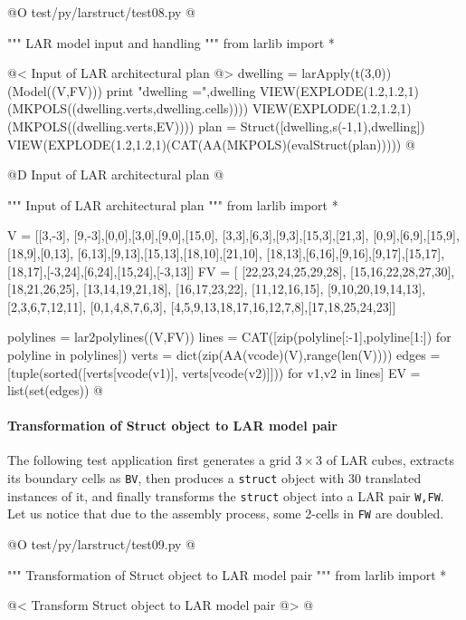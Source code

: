 \documentclass[11pt,oneside]{article}    %
\begin{document}
@O test/py/larstruct/test08.py
@{""" LAR model input and handling """
from larlib import *

@< Input of LAR architectural plan @>
dwelling = larApply(t(3,0))(Model((V,FV)))
print "\n dwelling =",dwelling
VIEW(EXPLODE(1.2,1.2,1)(MKPOLS((dwelling.verts,dwelling.cells))))
VIEW(EXPLODE(1.2,1.2,1)(MKPOLS((dwelling.verts,EV))))
plan = Struct([dwelling,s(-1,1),dwelling])
VIEW(EXPLODE(1.2,1.2,1)(CAT(AA(MKPOLS)(evalStruct(plan)))))
@}



@D Input of LAR architectural plan
@{""" Input of LAR architectural plan """
from larlib import *

V = [[3,-3],
[9,-3],[0,0],[3,0],[9,0],[15,0],
[3,3],[6,3],[9,3],[15,3],[21,3], 
[0,9],[6,9],[15,9],[18,9],[0,13],
[6,13],[9,13],[15,13],[18,10],[21,10], 
[18,13],[6,16],[9,16],[9,17],[15,17],
[18,17],[-3,24],[6,24],[15,24],[-3,13]]
FV = [
[22,23,24,25,29,28], [15,16,22,28,27,30], [18,21,26,25], 
[13,14,19,21,18], [16,17,23,22], [11,12,16,15],
[9,10,20,19,14,13], [2,3,6,7,12,11], [0,1,4,8,7,6,3],
[4,5,9,13,18,17,16,12,7,8],[17,18,25,24,23]]

polylines = lar2polylines((V,FV))
lines = CAT([zip(polyline[:-1],polyline[1:]) for polyline in polylines])	
verts = dict(zip(AA(vcode)(V),range(len(V))))
edges = [tuple(sorted([verts[vcode(v1)], verts[vcode(v2)]])) for v1,v2 in lines]
EV = list(set(edges))
@}



\paragraph{Transformation of Struct object to LAR model pair}

The following test application first generates a grid $3\times 3$ of LAR cubes, extracts
its boundary cells as \texttt{BV}, then produces a \texttt{struct} object with 30 translated instances of it,
and finally transforms the \texttt{struct} object into a LAR pair \texttt{W,FW}.
Let us notice that due to the assembly process, some 2-cells in \texttt{FW} are doubled.

@O test/py/larstruct/test09.py
@{""" Transformation of Struct object to LAR model pair """
from larlib import *

@< Transform Struct object to LAR model pair @>
@}
\end{document}

